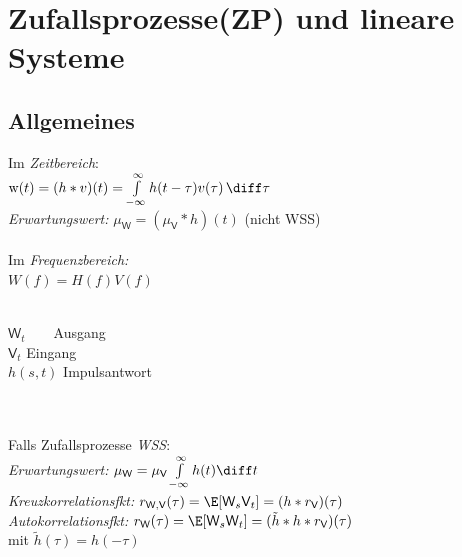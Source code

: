 \documentclass[german,color,6pt]{latex4ei/latex4ei_sheet}
\begin{document}
\section{Zufallsprozesse(ZP) und lineare Systeme}
\begin{sectionbox}
	\subsection{Allgemeines}
	Im \emph{Zeitbereich}:\\
	$\text{w}(t)  =  (h \ast v)(t) = \int\limits_{- \infty}^{\infty} h(t - \tau) v(\tau) \, \diff\tau$ \\
	\emph{Erwartungswert:} $\mu_{\textsf{W}} = (\mu_{\textsf{V}} \ast h)(t)$ (nicht WSS)\\
	\\
	Im \emph{Frequenzbereich:}\\
	$W(f) = H(f)V(f)$ \\ \\
	\parbox{3.8cm}{}
	\parbox{3.5cm}{$\textsf{W}_t$  \,\,\,\,\,\,\,\,  Ausgang\\
		$\textsf{V}_t$  \qquad Eingang\\
		$h(s,t)$  Impulsantwort}	\\ \\
	Falls Zufallsprozesse \emph{WSS}: \\
	\emph{Erwartungswert:} $\mu_{\textsf{W}} = \mu_{\textsf{V}} \int\limits_{-\infty}^{\infty} h(t) \diff t$\\
	\emph{Kreuzkorrelationsfkt:} $r_{\textsf{W},\textsf{V}}(\tau) = \E [\textsf{W}_s \textsf{V}_t] =  (h * r_{\textsf{V}})(\tau)$\\
	\emph{Autokorrelationsfkt:} $r_{\textsf{W}}(\tau) = \E [\textsf{W}_s \textsf{W}_t] = (\tilde h * h * r_{\textsf{V}})(\tau)$\\ 
	 mit $\tilde h (\tau) = h(-\tau)$
\end{sectionbox}
\end{document}
